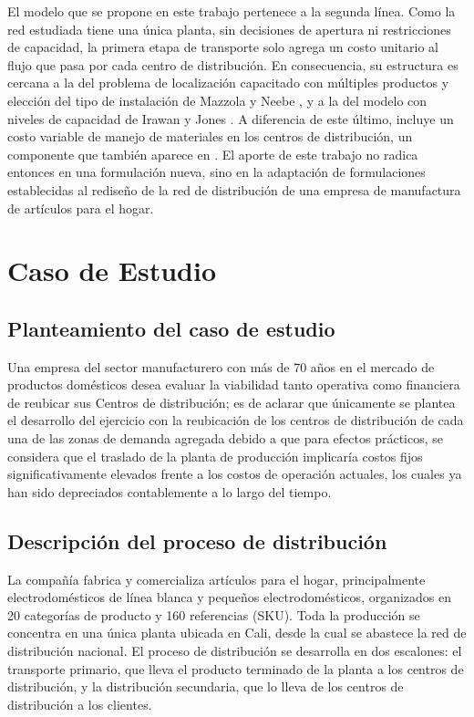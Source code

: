 \documentclass[fleqn, 11pt,letterpaper]{article}
\begin{document}
El modelo que se propone en este trabajo pertenece a la segunda línea. Como la red estudiada tiene una única planta, sin decisiones de apertura ni restricciones de capacidad, la primera etapa de transporte solo agrega un costo unitario al flujo que pasa por cada centro de distribución. En consecuencia, su estructura es cercana a la del problema de localización capacitado con múltiples productos y elección del tipo de instalación de Mazzola y Neebe \cite{Maz99}, y a la del modelo con niveles de capacidad de Irawan y Jones \cite{Ira19}. A diferencia de este último, incluye un costo variable de manejo de materiales en los centros de distribución, un componente que también aparece en \cite{Li14, Wu19}. El aporte de este trabajo no radica entonces en una formulación nueva, sino en la adaptación de formulaciones establecidas al rediseño de la red de distribución de una empresa de manufactura de artículos para el hogar.

\section{Caso de Estudio}
\subsection{Planteamiento del caso de estudio}
Una empresa del sector manufacturero con más de 70 años en el mercado de productos domésticos desea evaluar la viabilidad tanto operativa como financiera de reubicar sus Centros de distribución; es de aclarar que únicamente se plantea el desarrollo del ejercicio con la reubicación de los centros de distribución de cada una de las zonas de demanda agregada debido a que para efectos prácticos, se considera que el traslado de la planta de producción implicaría costos fijos significativamente elevados frente a los costos de operación actuales, los cuales ya han sido depreciados contablemente a lo largo del tiempo.

\subsection{Descripción del proceso de distribución}
La compañía fabrica y comercializa artículos para el hogar, principalmente electrodomésticos de línea blanca y pequeños electrodomésticos, organizados en 20 categorías de producto y 160 referencias (SKU). Toda la producción se concentra en una única planta ubicada en Cali, desde la cual se abastece la red de distribución nacional. El proceso de distribución se desarrolla en dos escalones: el transporte primario, que lleva el producto terminado de la planta a los centros de distribución, y la distribución secundaria, que lo lleva de los centros de distribución a los clientes.
\end{document}
